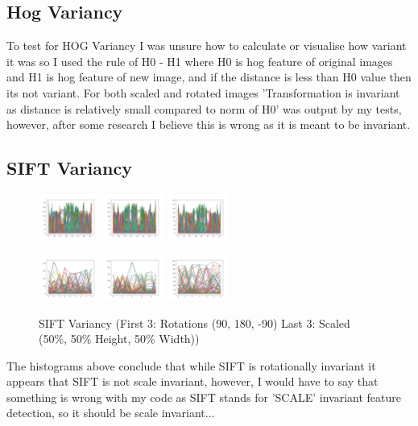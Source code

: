 \documentclass[conference]{IEEEtran}
\begin{document}
\subsection{Hog Variancy}
To test for HOG Variancy I was unsure how to calculate or visualise how variant it was so I used the rule of H0 - H1 where H0 is hog feature of original images and H1 is hog feature of new image, and if the distance is less than H0 value then its not variant.
For both scaled and rotated images 'Transformation is invariant as distance is relatively small compared to norm of H0' was output by my tests, however, after some research I believe this is wrong as it is meant to be invariant.
\subsection{SIFT Variancy}
\begin{figure}[htbp]
    \centerline{
        {\includegraphics[width=20mm, scale=0.5]{./figures/task 2/90deg-card-SIFT.png}}
        {\includegraphics[width=20mm, scale=0.5]{./figures/task 2/180deg-card-SIFT.png}}
        {\includegraphics[width=20mm, scale=0.5]{./figures/task 2/n90deg-card-SIFT.png}}
    }
    \centerline{
        {\includegraphics[width=20mm, scale=0.5]{./figures/task 2/50w50h-dugong-sift.png}}
        {\includegraphics[width=20mm, scale=0.5]{./figures/task 2/1w50h-dugong-sift.png}}
        {\includegraphics[width=20mm, scale=0.5]{./figures/task 2/50w1h-dugong-sift.png}}
    }
    \caption{SIFT Variancy (First 3: Rotations (90\degree, 180\degree, -90\degree) Last 3: Scaled (50\%, 50\% Height, 50\% Width))}
    \label{fig}
\end{figure}
The histograms above conclude that while SIFT is rotationally invariant it appears that SIFT is not scale invariant, however, I would have to say that
something is wrong with my code as SIFT stands for 'SCALE' invariant feature detection, so it should be scale invariant...
\end{document}
